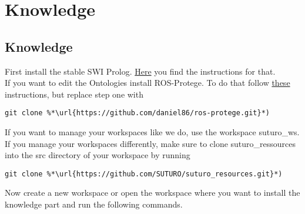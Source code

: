 \documentclass[main.tex]{subfiles}
\begin{document}
\section{Knowledge}
\subsection{Knowledge}
First install the stable SWI Prolog. \href{https://www.swi-prolog.org/build/PPA.html}{Here} you find the instructions for that.\\
If you want to edit the Ontologies install ROS-Protege. To do that follow \href{https://github.com/protegeproject/protege/wiki/Building-from-Source}{these} instructions, but replace step one with
\begin{lstlisting}
git clone %*\url{https://github.com/daniel86/ros-protege.git}*)
\end{lstlisting}

If you want to manage your workspaces like we do, use the workspace suturo\_ws.\\
If you manage your workspaces differently, make sure to clone suturo\_ressources into the src directory of your workspace by running
\begin{lstlisting}
git clone %*\url{https://github.com/SUTURO/suturo_resources.git}*) 
\end{lstlisting}
Now create a new workspace or open the workspace where you want to install the knowledge part and run the following commands.\\
\begin{mdframed}[backgroundcolor=mygray, rightline=false]

\end{mdframed}
\end{document}
